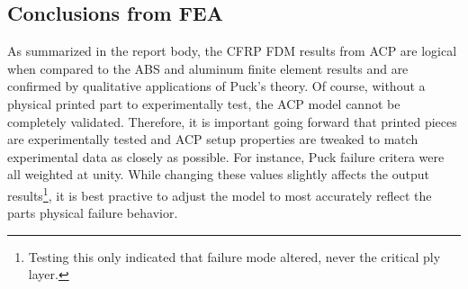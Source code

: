 \clearpage

\subsection{Conclusions from FEA}

As summarized in the report body, the CFRP FDM results from ACP are logical when compared to the ABS and aluminum finite element results and are confirmed by qualitative applications of Puck's theory. Of course, without a physical printed part to experimentally test, the ACP model cannot be completely validated. Therefore, it is important going forward that printed pieces are experimentally tested and ACP setup properties are tweaked to match experimental data as closely as possible. For instance, Puck failure critera were all weighted at unity. While changing these values slightly affects the output results\footnote{Testing this only indicated that failure mode altered, never the critical ply layer.}, it is best practive to adjust the model to most accurately reflect the parts physical failure behavior.

\clearpage

